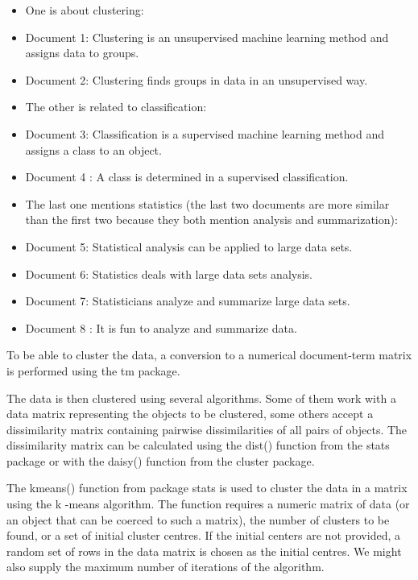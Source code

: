 \begin{itemize}
  \item One is about clustering:
  \item Document 1: Clustering is an unsupervised machine learning method and assigns data to groups.
  \item Document 2: Clustering finds groups in data in an unsupervised way.
  \item The other is related to classification:
  \item Document 3: Classification is a supervised machine learning method and assigns a class to an object.
  \item Document 4 : A class is determined in a supervised classification.
  \item The last one mentions statistics (the last two documents are more similar than the first two because they both mention analysis and summarization):
  \item Document 5: Statistical analysis can be applied to large data sets.
  \item Document 6: Statistics deals with large data sets analysis.
  \item Document 7: Statisticians analyze and summarize large data sets.
  \item Document 8 : It is fun to analyze and summarize data.
\end{itemize}

To be able to cluster the data, a conversion to a numerical document-term matrix is performed using the tm package.

The data is then clustered using several algorithms. Some of them work with a data matrix representing the objects to be clustered, some others accept a dissimilarity matrix containing pairwise dissimilarities of all pairs of objects. The\\
dissimilarity matrix can be calculated using the dist() function from the stats package or with the daisy() function from the cluster package.

The kmeans() function from package stats is used to cluster the data in a matrix using the k -means algorithm. The function requires a numeric matrix of data (or an object that can be coerced to such a matrix), the number of clusters to be found, or a set of initial cluster centres. If the initial centers are not provided, a random set of rows in the data matrix is chosen as the initial centres. We might also supply the maximum number of iterations of the algorithm.

